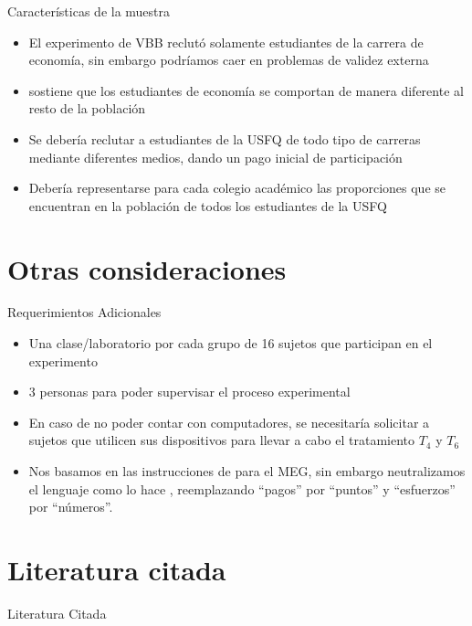 \documentclass[t,9pt,xcolor=dvipsnames]{beamer}
\begin{document}
\begin{frame}{Características de la muestra}
\begin{itemize}
    \item El experimento de VBB reclutó solamente estudiantes de la carrera de economía, sin embargo podríamos caer en problemas de validez externa
    \item \textcite{Jacquemet.2018} sostiene que los estudiantes de economía se comportan de manera diferente al resto de la población
    \item Se debería reclutar a estudiantes de la USFQ de todo tipo de carreras mediante diferentes medios, dando un pago inicial de participación
    \item Debería representarse para cada colegio académico las proporciones que se encuentran en la población de todos los estudiantes de la USFQ
\end{itemize}
    \end{frame}       
\section{Otras consideraciones}
\begin{frame}{Requerimientos Adicionales}
\begin{itemize}

\item Una clase/laboratorio por cada grupo de 16 sujetos que participan en el experimento
\item 3 personas para poder supervisar el proceso experimental
\item En caso de no poder contar con computadores, se necesitaría solicitar a sujetos que utilicen sus dispositivos para llevar a cabo el tratamiento $T_4$ y $T_6$
\item Nos basamos en las instrucciones de \textcite{Holt.2007} para el MEG, sin embargo neutralizamos el lenguaje como lo hace \textcite{Weidenholzer.12282012}, reemplazando ``pagos'' por ``puntos'' y ``esfuerzos'' por ``números''. 
\end{itemize}
\end{frame}
\section{Literatura citada}
\begin{frame}{Literatura Citada}
\printbibliography
    
\end{frame}
\end{document}
